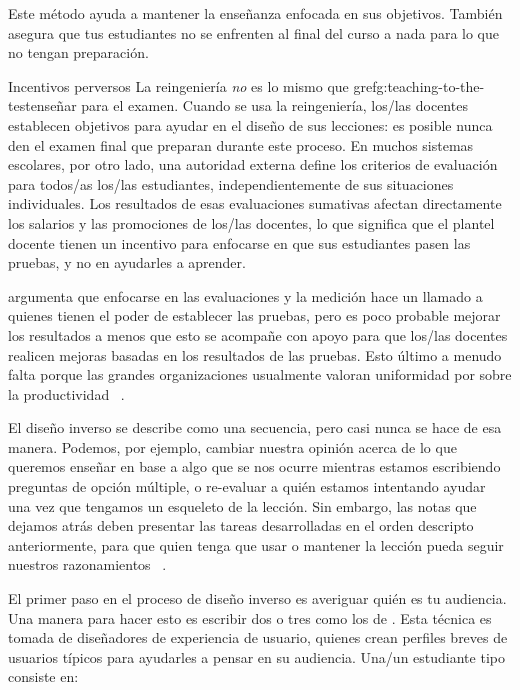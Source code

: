 Este método ayuda a mantener la enseñanza enfocada en sus objetivos.
También asegura que tus estudiantes no se enfrenten al final del curso
a nada para lo que no tengan preparación.
 
\begin{aside}{Incentivos perversos}
La reingeniería \emph{no} es lo mismo que gref{g:teaching-to-the-test}{enseñar para el examen}.
Cuando se usa la reingeniería,
los/las docentes establecen objetivos para ayudar en el diseño de sus lecciones:
es posible nunca den el examen final que preparan durante este proceso.
En muchos sistemas escolares,
por otro lado,
una autoridad externa define los criterios de evaluación para todos/as los/las estudiantes,
independientemente de sus situaciones individuales.
Los resultados de esas evaluaciones sumativas afectan directamente los salarios y las promociones de los/las docentes,
lo que significa que el plantel docente tienen un incentivo para enfocarse en que sus estudiantes pasen las pruebas, y no en ayudarles a aprender.
 
\cite{Gree2014} argumenta que enfocarse en las evaluaciones y la medición hace un llamado a quienes tienen el poder de establecer las pruebas, pero es poco probable mejorar los resultados
a menos que esto se acompañe con apoyo para que los/las docentes realicen mejoras basadas en los resultados de las pruebas.
Esto último a menudo falta porque
las grandes organizaciones usualmente valoran uniformidad por sobre la productividad ~\cite{Scot1998}.
\end{aside}
 
El diseño inverso se describe como una secuencia,
pero casi nunca se hace de esa manera.
Podemos,
por ejemplo, cambiar nuestra opinión acerca de lo que queremos enseñar
en base a algo que se nos ocurre mientras estamos escribiendo preguntas de opción múltiple,
o re-evaluar a quién estamos intentando ayudar una vez que tengamos un esqueleto de la lección.
Sin embargo,
las notas que dejamos atrás deben presentar las tareas desarrolladas en el orden descripto anteriormente, para que quien tenga que usar o mantener la lección pueda seguir nuestros razonamientos
~\cite{Parn1986}.
 
 
El primer paso en el proceso de diseño inverso es averiguar quién es tu audiencia.
Una manera para hacer esto es escribir dos o tres
como los de .
Esta técnica es tomada de diseñadores de experiencia de usuario,
quienes crean perfiles breves de usuarios típicos
para ayudarles a pensar en su audiencia.
Una/un estudiante tipo consiste en:
 
